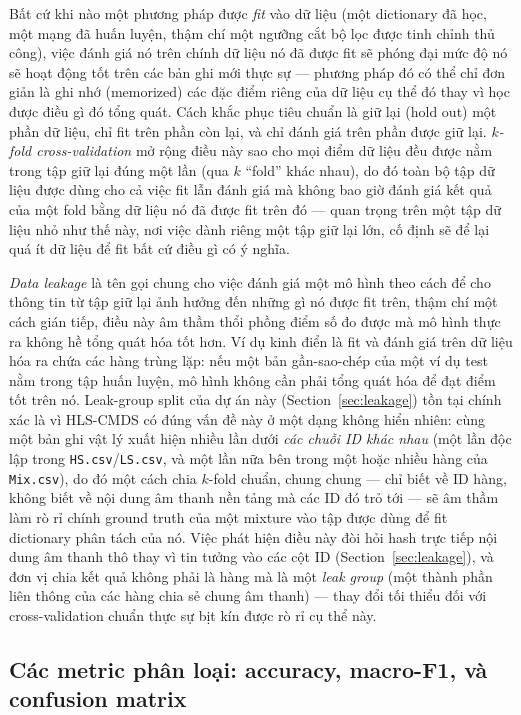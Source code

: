 \documentclass[11pt]{article}
\begin{document}
Bất cứ khi nào một phương pháp được \emph{fit} vào dữ liệu (một dictionary
đã học, một mạng đã huấn luyện, thậm chí một ngưỡng cắt bộ lọc được tinh
chỉnh thủ công), việc đánh giá nó trên chính dữ liệu nó đã được fit sẽ
phóng đại mức độ nó sẽ hoạt động tốt trên các bản ghi mới thực sự ---
phương pháp đó có thể chỉ đơn giản là ghi nhớ (memorized) các đặc điểm
riêng của dữ liệu cụ thể đó thay vì học được điều gì đó tổng quát. Cách
khắc phục tiêu chuẩn là giữ lại (hold out) một phần dữ liệu, chỉ fit trên
phần còn lại, và chỉ đánh giá trên phần được giữ lại. \emph{$k$-fold
cross-validation} mở rộng điều này sao cho mọi điểm dữ liệu đều được nằm
trong tập giữ lại đúng một lần (qua $k$ ``fold'' khác nhau), do đó toàn bộ
tập dữ liệu được dùng cho cả việc fit lẫn đánh giá mà không bao giờ đánh
giá kết quả của một fold bằng dữ liệu nó đã được fit trên đó --- quan
trọng trên một tập dữ liệu nhỏ như thế này, nơi việc dành riêng một tập
giữ lại lớn, cố định sẽ để lại quá ít dữ liệu để fit bất cứ điều gì có ý
nghĩa.

\emph{Data leakage} là tên gọi chung cho việc đánh giá một mô hình theo
cách để cho thông tin từ tập giữ lại ảnh hưởng đến những gì nó được fit
trên, thậm chí một cách gián tiếp, điều này âm thầm thổi phồng điểm số đo
được mà mô hình thực ra không hề tổng quát hóa tốt hơn. Ví dụ kinh điển là
fit và đánh giá trên dữ liệu hóa ra chứa các hàng trùng lặp: nếu một bản
gần-sao-chép của một ví dụ test nằm trong tập huấn luyện, mô hình không
cần phải tổng quát hóa để đạt điểm tốt trên nó. Leak-group split của dự
án này (Section~\ref{sec:leakage}) tồn tại chính xác là vì HLS-CMDS có
đúng vấn đề này ở một dạng không hiển nhiên: cùng một bản ghi vật lý xuất
hiện nhiều lần dưới \emph{các chuỗi ID khác nhau} (một lần độc lập trong
\texttt{HS.csv}/\texttt{LS.csv}, và một lần nữa bên trong một hoặc nhiều
hàng của \texttt{Mix.csv}), do đó một cách chia $k$-fold chuẩn, chung
chung --- chỉ biết về ID hàng, không biết về nội dung âm thanh nền tảng
mà các ID đó trỏ tới --- sẽ âm thầm làm rò rỉ chính ground truth của một
mixture vào tập được dùng để fit dictionary phân tách của nó. Việc phát
hiện điều này đòi hỏi hash trực tiếp nội dung âm thanh thô thay vì tin
tưởng vào các cột ID (Section~\ref{sec:leakage}), và đơn vị chia kết quả
không phải là hàng mà là một \emph{leak group} (một thành phần liên thông
của các hàng chia sẻ chung âm thanh) --- thay đổi tối thiểu đối với
cross-validation chuẩn thực sự bịt kín được rò rỉ cụ thể này.

\subsection{Các metric phân loại: accuracy, macro-F1, và confusion matrix}
\label{sec:bg-classmetrics}
\end{document}
